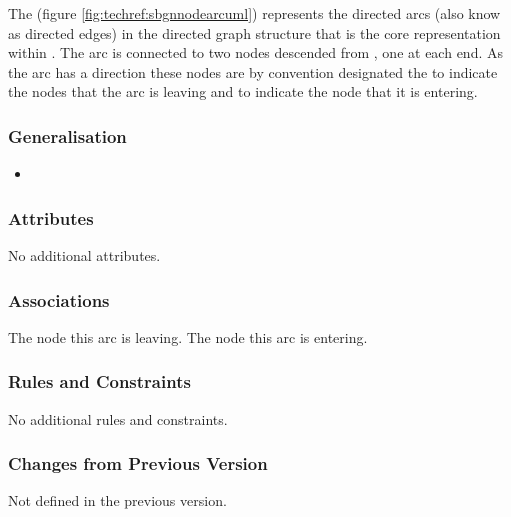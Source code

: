 The  (figure \ref{fig:techref:sbgnnodearcuml}) represents
the directed arcs (also know as directed edges) in the directed graph
structure that is the core representation within \PDl. The arc is
connected to two nodes descended from , one at
each end. As the arc has a direction these nodes are by convention
designated the  to indicate the nodes that the arc
is leaving and  to indicate the node that it is
entering.

\subsubsection{Generalisation}

\begin{itemize}
\item {}
\end{itemize}

\subsubsection{Attributes}

No additional attributes.

\subsubsection{Associations}

\begin{attributes}
   The node this arc is leaving.
   The node this arc is entering.
\end{attributes}

\subsubsection{Rules and Constraints}

No additional rules and constraints.

\subsubsection{Changes from Previous Version}

Not defined in the previous version.


\label{defn:EntityType}

